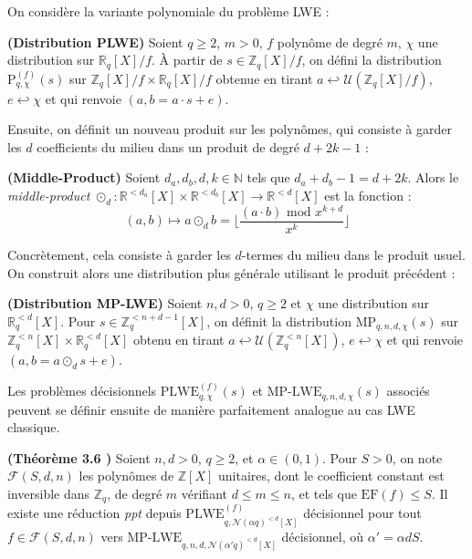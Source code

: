\documentclass[11pt,a4paper]{article}
\begin{document}
On considère la variante polynomiale du problème LWE :
\begin{defin}\textbf{(Distribution PLWE)}
Soient $q \geq 2$, $m>0$, $f$ polynôme de degré $m$, $\chi$ une distribution sur $\mathbb{R}_q[X]/f$. À partir de $s\in \mathbb{Z}_q[X]/f$, on défini la distribution $\text{P}^{(f)}_{q,\chi}(s)$ sur $\mathbb{Z}_q[X]/f \times \mathbb{R}_q[X]/f$ obtenue en tirant $a \hookleftarrow \mathcal{U}(\mathbb{Z}_q[X]/f)$, $e\hookleftarrow \chi$ et qui renvoie $(a,b=a\cdot s+e)$.
\end{defin}

Ensuite, on définit un nouveau produit sur les polynômes, qui consiste à garder les $d$ coefficients du milieu dans un produit de degré $d+2k-1$ : 
\begin{defin}\textbf{(Middle-Product)}
Soient $d_a,d_b,d,k \in \mathbb{N}$ tels que $d_a+d_b-1=d+2k$. Alors le \textit{middle-product} $\odot_d : \mathbb{R}^{<d_a}[X]\times\mathbb{R}^{<d_b}[X]\to\mathbb{R}^{<d}[X]$ est la fonction :
\[(a,b) \mapsto a \odot_d b = \lfloor \frac{(a\cdot b)\text{ mod }x^{k+d}}{x^k} \rfloor\]
\end{defin}
Concrètement, cela consiste à garder les $d$-termes du milieu dans le produit usuel. \\
On construit alors une distribution plus générale utilisant le produit précédent : 
\begin{defin}\textbf{(Distribution MP-LWE)}
Soient $n,d >0$, $q\geq 2$ et $\chi$ une distribution sur $\mathbb{R}_q^{<d}[X]$. Pour $s\in \mathbb{Z}_q^{<n+d-1}[X]$, on définit la distribution $\text{MP}_{q,n,d,\chi}(s)$ sur $\mathbb{Z}_q^{<n}[X]\times\mathbb{R}_q^{<d}[X]$ obtenu en tirant $a \hookleftarrow \mathcal{U}(\mathbb{Z}_q^{<n}[X])$, $e\hookleftarrow \chi$ et qui renvoie $(a,b=a\odot_d s+e)$. 
\end{defin}

Les problèmes décisionnels $\text{PLWE}^{(f)}_{q,\chi}(s)$ et $\text{MP-LWE}_{q,n,d,\chi}(s)$ associés peuvent se définir ensuite de manière parfaitement analogue au cas LWE classique. \\

\begin{theorem}\textbf{(Théorème 3.6 \cite{mplwe})}
Soient $n,d >0$, $q\geq 2$, et $\alpha \in (0,1)$. Pour $S>0$, on note $\mathcal{F}(S,d,n)$ les polynômes de $\mathbb{Z}[X]$ unitaires, dont le coefficient constant est inversible dans $\mathbb{Z}_q$, de degré $m$ vérifiant $d\leq m\leq n$, et tels que $\text{EF}(f)\leq S$. Il existe une réduction \textit{ppt} depuis $\text{PLWE}^{(f)}_{q,\mathcal{N}(\alpha q)^{<d}[X]}$ décisionnel pour tout $f\in\mathcal{F}(S,d,n)$ vers  $\text{MP-LWE}_{q,n,d,\mathcal{N}(\alpha' q)^{<d}[X]}$ décisionnel, où $\alpha' = \alpha d S$.
\end{theorem}
\end{document}

